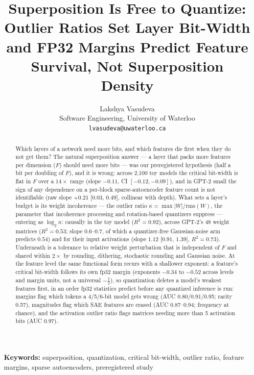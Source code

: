 \documentclass{article}
\title{Superposition Is Free to Quantize: Outlier Ratios Set Layer Bit-Width and FP32 Margins Predict Feature Survival, Not Superposition Density}
\author{Lakshya Vasudeva \\ Software Engineering, University of Waterloo \\ \texttt{lvasudeva@uwaterloo.ca}}
\begin{document}
\nolinenumbers
\maketitle
\vspace{-18pt}
\begin{abstract}
Which layers of a network need more bits, and which features die first when they do not get them? The natural
superposition answer --- a layer that packs more features per dimension ($F$) should need more bits --- was our
preregistered hypothesis (half a bit per doubling of $F$), and it is wrong: across 2{,}100 toy models the critical
bit-width is flat in $F$ over a $14\times$ range (slope $-0.11$, CI $[-0.12,-0.09]$), and in GPT-2 small the sign of any
dependence on a per-block sparse-autoencoder feature count is not identifiable (raw slope $+0.21$ [$0.03$, $0.49$],
collinear with depth). What sets a layer's budget is its weight incoherence --- the outlier ratio
$\kappa=\max|W|/\mathrm{rms}(W)$, the parameter that incoherence processing and rotation-based quantizers suppress ---
entering as $\log_2\kappa$: causally in the toy model ($R^2=0.92$), across GPT-2's 48 weight matrices ($R^2=0.53$; slope
$0.6$--$0.7$, of which a quantizer-free Gaussian-noise arm predicts $0.54$) and for their input activations (slope $1.12$
[$0.91$, $1.39$], $R^2=0.73$). Underneath is a tolerance to relative weight perturbation that is independent of $F$ and
shared within $2\times$ by rounding, dithering, stochastic rounding and Gaussian noise. At the feature level the same
functional form recurs with a shallower exponent: a feature's critical bit-width follows its own fp32 margin (exponents
$-0.34$ to $-0.52$ across levels and margin units, not a universal $-\tfrac12$), so quantization deletes a model's
weakest features first, in an order fp32 statistics predict before any quantized inference is run: margins flag which
tokens a 4/5/6-bit model gets wrong (AUC 0.80/0.91/0.95; rarity 0.57), magnitudes flag which SAE features are erased
(AUC 0.87--0.94; frequency at chance), and the activation outlier ratio flags matrices needing more than 5 activation
bits (AUC 0.97).
\end{abstract}
\begin{center}\vspace{-1pt}\small\textbf{Keywords:} superposition, quantization, critical bit-width, outlier ratio, feature margins, sparse autoencoders, preregistered study\end{center}
\end{document}

